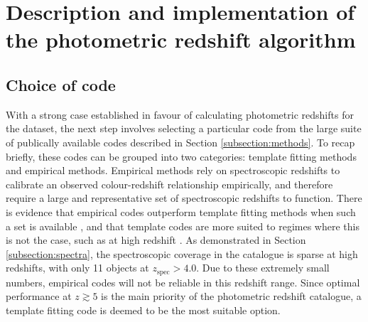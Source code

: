 \section{Description and implementation of the photometric redshift algorithm}\label{section:LePHARE}
\subsection{Choice of code}\label{subsection:code_choice}
With a strong case established in favour of calculating photometric redshifts for the \DESVIDEO dataset, the next step involves selecting a particular code from the large suite of publically available codes described in 
Section \ref{subsection:methods}. To recap briefly, these codes can be grouped into two categories: template fitting methods and empirical methods. Empirical methods rely on spectroscopic redshifts to calibrate an observed colour-redshift relationship empirically, and therefore require a large and representative set of spectroscopic redshifts to function. There is evidence that empirical codes outperform template fitting methods when such a set is available \citep{2011MNRAS.417.1891A,2019NatAs...3..212S}, and that template codes are more suited to regimes where this is not the case, such as at high redshift \citep{2019NatAs...3..212S}. As demonstrated in Section \ref{subsection:spectra}, the spectroscopic coverage in the \DESVIDEO catalogue is sparse at high redshifts, with only 11 objects at $z_{\mathrm{spec}}>4.0$. Due to these extremely small numbers, empirical codes will not be reliable in this redshift range. Since optimal performance at $z\gtrsim5$ is the main priority of the photometric redshift catalogue, a template fitting code is deemed to be the most suitable option. \par


